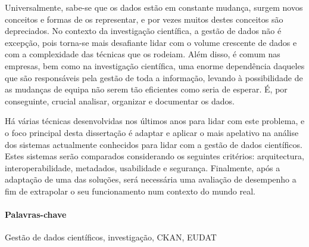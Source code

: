 Universalmente, sabe-se que os dados estão em constante mudança, surgem novos conceitos e formas de os representar, e por vezes muitos destes conceitos são depreciados. No contexto da investigação científica, a gestão de dados não é excepção, pois torna-se mais desafiante lidar com o volume crescente de dados e com a complexidade das técnicas que os rodeiam. Além disso, é comum nas empresas, bem como na investigação científica, uma enorme dependência daqueles que são responsáveis pela gestão de toda a informação, levando à possibilidade de as mudanças de equipa não serem tão eficientes como seria de esperar. É, por conseguinte, crucial analisar, organizar e documentar os dados.
    
Há várias técnicas desenvolvidas nos últimos anos para lidar com este problema, e o foco principal desta dissertação é adaptar e aplicar o mais apelativo na análise dos sistemas actualmente conhecidos para lidar com a gestão de dados científicos. Estes sistemas serão comparados considerando os seguintes critérios: arquitectura, interoperabilidade, metadados, usabilidade e segurança. Finalmente, após a adaptação de uma das soluções, será necessária uma avaliação de desempenho a fim de extrapolar o seu funcionamento num contexto do mundo real.

\paragraph{Palavras-chave} Gestão de dados científicos, investigação, CKAN, EUDAT
